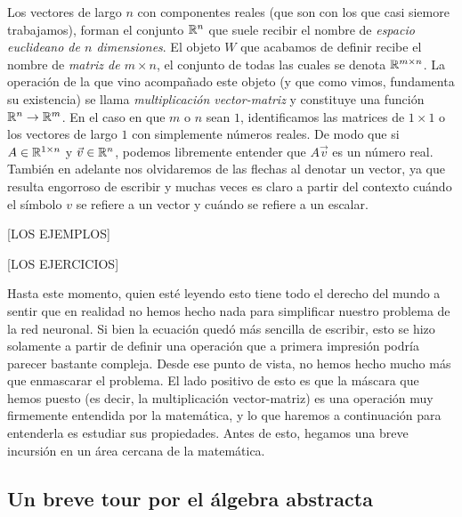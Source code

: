 \begin{tcolorbox}[title={Definiciones (Espacio $\R^n$, matriz, multiplicación vector-matriz)}]
    Los vectores de largo $n$ con componentes reales (que son con los que casi siemore trabajamos), forman el conjunto $\R^n$ que suele recibir el nombre de \textit{espacio euclideano de $n$ dimensiones}. El objeto $W$ que acabamos de definir recibe el nombre de \textit{matriz de $m \times n$}, el conjunto de todas las cuales se denota $\mathbb{R}^{m \times n}$. La operación de la que vino acompañado este objeto (y que como vimos, fundamenta su existencia) se llama \textit{multiplicación vector-matriz} y constituye una función $\mathbb{R}^n \to \mathbb{R}^m$. En el caso en que $m$ o $n$ sean $1$, identificamos las matrices de $1 \times 1$ o los vectores de largo $1$ con simplemente números reales. De modo que si $A \in \mathbb{R}^{1 \times n}$ y $\vec{v} \in \mathbb{R}^n$, podemos libremente entender que $A\vec{v}$ es un número real. También en adelante nos olvidaremos de las flechas al denotar un vector, ya que resulta engorroso de escribir y muchas veces es claro a partir del contexto cuándo el símbolo $v$ se refiere a un vector y cuándo se refiere a un escalar.
\end{tcolorbox}

[LOS EJEMPLOS]

[LOS EJERCICIOS]

\begin{tcolorbox}[title=Comentario]
    Hasta este momento, quien esté leyendo esto tiene todo el derecho del mundo a sentir que en realidad no hemos hecho nada para simplificar nuestro problema de la red neuronal. Si bien la ecuación quedó más sencilla de escribir, esto se hizo solamente a partir de definir una operación que a primera impresión podría parecer bastante compleja. Desde ese punto de vista, no hemos hecho mucho más que enmascarar el problema. El lado positivo de esto es que la máscara que hemos puesto (es decir, la multiplicación vector-matriz) es una operación muy firmemente entendida por la matemática, y lo que haremos a continuación para entenderla es estudiar sus propiedades. Antes de esto, hegamos una breve incursión en un área cercana de la matemática.
\end{tcolorbox}

\subsection{Un breve tour por el álgebra abstracta}


